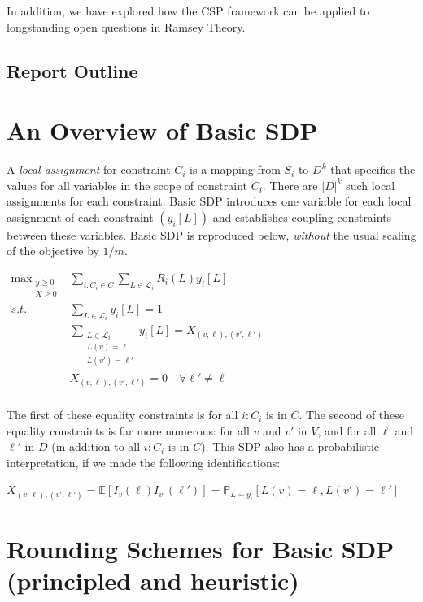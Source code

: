 \documentclass[11pt]{article} %
\begin{document}
In addition, we have explored how the CSP framework can be applied to longstanding open questions in Ramsey Theory.

\subsection{Report Outline}

\section{An Overview of Basic SDP}

A \emph{local assignment} for constraint $C_i$ is a mapping from $S_i$ to $D^k$ that specifies the values for all variables in the scope of constraint $C_i$. There are $|D|^k$ such local assignments for each constraint. Basic SDP introduces one variable for each local assignment of each constraint $(y_i[L])$ and establishes coupling constraints between these variables. Basic SDP \citep{raghavendra2008optimal} is reproduced below, \emph{without} the usual scaling of the objective by $1/m$.

$\begin{aligned}
\operatorname*{max}_{\substack{y \geq 0 \\  X \geq 0}} & \sum\limits_{i:C_i\in C} \sum\limits_{L\in \mathcal{L}_i} R_i(L)y_i[L] \\
s.t. & \sum\limits_{L \in \mathcal{L}_i} y_i[L] = 1 \\
& \sum\limits_{\substack{L \in \mathcal{L}_i \\ L(v)=\ell \\ L(v')=\ell '}} y_i[L] = X_{(v,\ell),(v',\ell')} \\
& X_{(v,\ell),(v',\ell')} = 0 \quad \forall \ell' \neq \ell \\
\end{aligned}$

The first of these equality constraints is for all $i : C_i$ is in $C$. The second of these equality constraints is far more numerous: for all $v$ and $v'$ in $V$, and for all $\ell$ and $\ell'$ in $D$ (in addition to all $i:C_i$ is in $C$). This SDP also has a probabilistic interpretation, if we made the following identifications:

$X_{(v,\ell),(v',\ell')} = \mathbb{E}[I_v(\ell)I_{v'}(\ell')] = \mathbb{P}_{L\sim y_i}[L(v)=\ell, L(v')=\ell']$

\section{Rounding Schemes for Basic SDP (principled and heuristic)}
\end{document}
